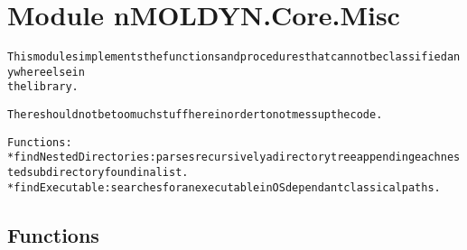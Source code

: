 %
%
%


\section{Module nMOLDYN.Core.Misc}

    \label{nMOLDYN:Core:Misc}
\begin{alltt}
This modules implements the functions and procedures that can not be classified anywhere else in 
the library.

There should not be too much stuff here in order to not mess up the code.

Functions:
    * findNestedDirectories : parses recursively a directory tree appending each nested subdirectory found in a list.
    * findExecutable        : searches for an executable in OS dependant classical paths.
\end{alltt}



  \subsection{Functions}

    \label{nMOLDYN:Core:Misc:findNestedDirectories}

    \vspace{0.5ex}

